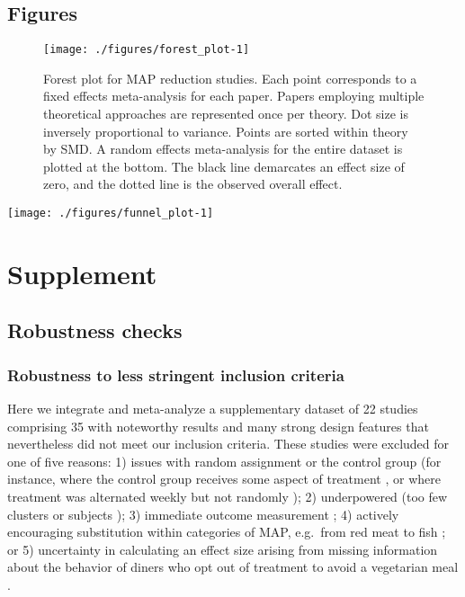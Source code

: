 \documentclass[sn-nature,referee,pdflatex]{sn-jnl}
\begin{document}
\FloatBarrier 
\newpage

\subsection{Figures}\label{figures}

\begin{figure}[H]

{\centering \texttt{[image: ./figures/forest\_plot-1]} 

}

\caption{Forest plot for MAP reduction studies. Each point corresponds to a fixed effects meta-analysis for each paper. Papers employing multiple theoretical approaches are represented once per theory. Dot size is inversely proportional to variance. Points are sorted within theory by SMD. A random effects meta-analysis for the entire dataset is plotted at the bottom. The black line demarcates an effect size of zero, and the dotted line is the observed overall effect.}\label{fig:forest_plot}
\end{figure}

\texttt{[image: ./figures/funnel\_plot-1]}

\newpage

\section{Supplement}\label{Sec5}

\subsection{Robustness checks}\label{Sec5.1}

\subsubsection{Robustness to less stringent inclusion
criteria}\label{Sec5.1.1}

Here we integrate and meta-analyze a supplementary dataset of 22 studies
comprising 35 with noteworthy results and many strong design features
that nevertheless did not meet our inclusion criteria. These studies
were excluded for one of five reasons: 1) issues with random assignment
or the control group (for instance, where the control group receives
some aspect of treatment \citep{piazza2022}, or where treatment was
alternated weekly but not randomly \citep{garnett2020}); 2) underpowered
(too few clusters \citep{reinders2017} or subjects \citep{lentz2019});
3) immediate outcome measurement
\citep{dannenberg2023, sparkman2017, griesoph2021, hansen2021}; 4)
actively encouraging substitution within categories of MAP, e.g.~from
red meat to fish \citep{celis2017, johansen2009}; or 5) uncertainty in
calculating an effect size arising from missing information about the
behavior of diners who opt out of treatment to avoid a vegetarian meal
\citep{betterfoodfoundation2023}.
\end{document}

